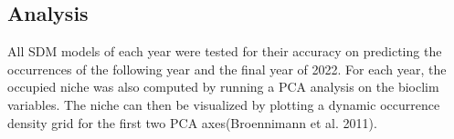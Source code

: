 \documentclass[12pt]{article}
\begin{document}
\subsection{Analysis}
All SDM models of each year were tested for their accuracy on predicting the occurrences of the following year and the final year of 2022. 
For each year, the occupied niche was also computed by running a PCA analysis on the bioclim variables. The niche can then be visualized by plotting a dynamic occurrence density grid for the first two PCA axes(Broennimann et al. 2011). 

\end{document}
